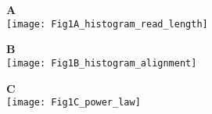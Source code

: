 \documentclass[10pt]{article}
\begin{document}
\begin{minipage}[t]{.32\linewidth}
  \textbf{A}\\
  \texttt{[image: Fig1A\_histogram\_read\_length]}
\end{minipage}
\begin{minipage}[t]{.32\linewidth}
  \textbf{B}\\
  \texttt{[image: Fig1B\_histogram\_alignment]}
\end{minipage}
\begin{minipage}[t]{.32\linewidth}
  \textbf{C}\\
  \texttt{[image: Fig1C\_power\_law]}
\end{minipage}
\end{document}
